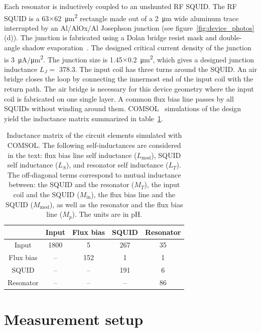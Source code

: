 \documentclass[10pt]{iopart}
\begin{document}
Each resonator is inductively coupled to an unshunted RF SQUID. The RF SQUID is a 63$\times$\qty{62}{\um^2} rectangle made out of a \qty{2}{\um} wide aluminum trace interrupted by an Al/AlOx/Al Josephson junction (see figure~\ref{fig:device_photos}(d)). The junction is fabricated using a Dolan bridge resist mask and double-angle shadow evaporation~\cite{gingras_improving_2025}. The designed critical current density of the junction is \qty{3}{\uA/\um^2}. The junction size is 1.45$\times$\qty{0.2}{\um^2}, which gives a designed junction inductance $L_J = $ \qty{378.3}{\pH}. The input coil has three turns around the SQUID. An air bridge closes the loop by connecting the innermost end of the input coil with the return path. The air bridge is necessary for this device geometry where the input coil is fabricated on one single layer. A common flux bias line passes by all SQUIDs without winding around them. COMSOL~\cite{comsol_multiphysics} simulations of the design yield the inductance matrix summarized in table~\ref{tab:COMSOL_sim}.

\begin{table}[htb]
    \centering
    \begin{tabular}{c c c c c}
    \hline
          &  \small{Input}& \small{Flux bias} & \small{SQUID} & \small{Resonator} \\
    \hline
    \small{Input} & 1800 & 5 & 267 & 35 \\
    \small{Flux bias} & -- & 152 & 1 & 1 \\
    \small{SQUID} & -- & -- & 191 & 6 \\
    \small{Resonator} & -- & -- & -- & 86 \\
    \hline
    \end{tabular}
    \caption{Inductance matrix of the circuit elements simulated with COMSOL. The following self-inductances are considered in the text: flux bias line self inductance ($L_{\mathrm{mod}}$), SQUID self inductance ($L_S$), and resonator self inductance ($L_T$).  The off-diagonal terms correspond to mutual inductance between: the SQUID and the resonator ($M_T$), the input coil and the SQUID ($M_{\mathrm{in}}$), the flux bias line and the SQUID ($M_{\mathrm{mod}}$), as well as the resonator and the flux bias line ($M_p$). The units are in pH.}
    \label{tab:COMSOL_sim}
\end{table}

\section{Measurement setup}
\label{sec:setup}
\end{document}
